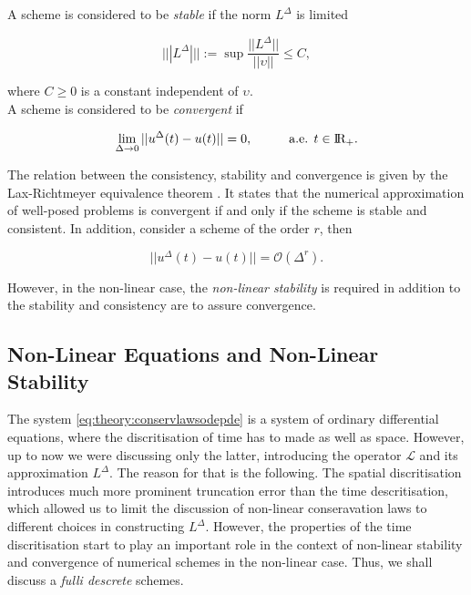 \documentclass[11pt,a4paper,headinclude=true,DIV=14,BCOR=8mm,chapterprefix,listof=totoc,twoside,openright,abstracton]{scrbook}
\begin{document}
A scheme is considered to be \textit{stable} if the norm $L^{\Delta}$ is limited 

\begin{equation}
    |||L^{\Delta}||| := \sup \frac{||L^{\Delta}||}{||\upsilon||}\leq C,
\end{equation}

where $C\geq 0$ is a constant independent of $\upsilon$. \\
A scheme is considered to be \textit{convergent} if 

\begin{equation}
    \lim_{\Delta\rightarrow 0} ||u^{\Delta}(t)-u(t)|| = 0, \hspace{10mm} \text{a.e. } t\in \text{I\!R}_{+}.
\end{equation}

The relation between the consistency, stability and convergence is given by the Lax-Richtmeyer equivalence theorem \cite{Lax:1956}. It states that the numerical approximation of well-posed problems is convergent if and only if the scheme is stable and consistent. In addition, consider a scheme of the order $r$, then

\begin{equation}
    || u^{\Delta}(t) - u(t) || = \mathcal{O}(\Delta^r).
\end{equation}

However, in the non-linear case, the \textit{non-linear stability} is required in addition to the stability and consistency are to assure convergence. 

\subsection{Non-Linear Equations and Non-Linear Stability}

The system \ref{eq:theory:conservlawsodepde} is a system of ordinary differential equations, where the discritisation of time has to made as well as space. However, up to now we were discussing only the latter, introducing the operator $\mathcal{L}$ and its approximation $L^{\Delta}$. The reason for that is the following. The spatial discritisation introduces much more prominent truncation error than the time descritisation, which allowed us to limit the discussion of non-linear conseravation laws to different choices in constructing $L^{\Delta}$. However, the properties of the time discritisation start to play an important role in the context of non-linear stability and convergence of numerical schemes in the non-linear case. Thus, we shall discuss a \textit{fulli descrete} schemes. \\
\end{document}
